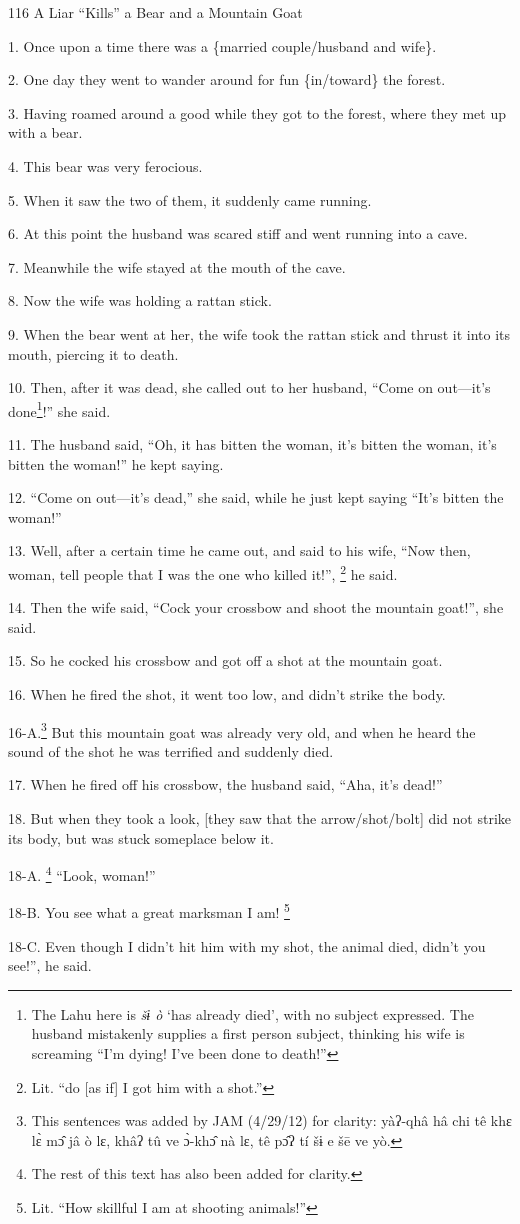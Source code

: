 
116 A Liar ``Kills'' a Bear and a Mountain Goat

1. Once upon a time there was a \{married couple/husband and wife\}.

2. One day they went to wander around for fun \{in/toward\} the forest.

3. Having roamed around a good while they got to the forest, where they met up
with a bear.

4. This bear was very ferocious.

5. When it saw the two of them, it suddenly came running.

6. At this point the husband was scared stiff and went running into a cave.

7. Meanwhile the wife stayed at the mouth of the cave.

8. Now the wife was holding a rattan stick.

9. When the bear went at her, the wife took the rattan stick and thrust it into
its mouth, piercing it to death.

10. Then, after it was dead, she called out to her husband, ``Come on out---it's
done\footnote{The Lahu here is \textit{šɨ ò} `has already died', with no subject expressed. The husband mistakenly supplies a first person subject, thinking his wife is screaming ``I'm dying! I've been done to death!''}!'' she said.

11. The husband said, ``Oh, it has bitten the woman, it's bitten the woman, it's
bitten the woman!'' he kept saying.

12. ``Come on out---it's dead,'' she said, while he just kept saying ``It's bitten
the woman!''

13. Well, after a certain time he came out, and said to his wife, ``Now then, woman,
tell people that I was the one who killed it!'', \footnote{Lit. ``do [as if] I got him with a shot.''} he said.

14. Then the wife said, ``Cock your crossbow and shoot the mountain goat!'', she
said.

15. So he cocked his crossbow and got off a shot at the mountain goat.

16. When he fired the shot, it went too low, and didn't strike the body.

16-A.\footnote{This sentences was added by JAM (4/29/12) for clarity:  yàʔ-qhâ hâ chi tê khɛ lɛ̀ mɔ̂ jâ ò lɛ, khâʔ tû ve ɔ̀-khɔ̂ nà lɛ, tê pɔ̂ʔ tí šɨ e šē ve yò.} But this mountain goat was already very old, and when he heard the sound
of the shot he was terrified and suddenly died.

17. When he fired off his crossbow, the husband said, ``Aha, it's dead!''

18. But when they took a look, [they saw that the arrow/shot/bolt] did not strike
its body, but was stuck someplace below it.

18-A. \footnote{The rest of this text has also been added for clarity.} ``Look, woman!''

18-B. You see what a great marksman I am! \footnote{Lit. ``How skillful I am at shooting animals!''}

18-C. Even though I didn't hit him with my shot, the animal died, didn't you see!'',
he said.

